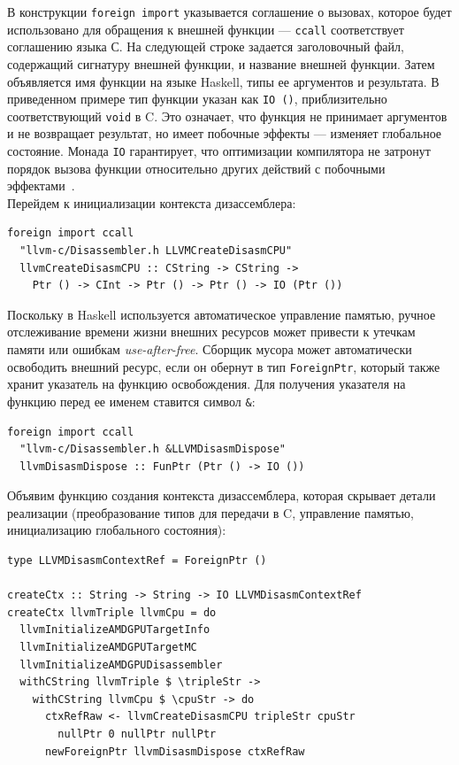 \documentclass[a4paper,14pt]{extarticle}
\begin{document}
{В конструкции \verb|foreign import| указывается соглашение о вызовах, которое будет
использовано для обращения к внешней функции — \verb|ccall| соответствует соглашению языка С.
На следующей строке задается заголовочный файл, содержащий сигнатуру внешней функции, и название внешней функции.
Затем объявляется имя функции на языке Haskell, типы ее аргументов и результата.
В приведенном примере тип функции указан как \verb|IO ()|, приблизительно соответствующий
\verb|void| в C. Это означает, что функция не принимает аргументов и не возвращает результат,
но имеет побочные эффекты — изменяет глобальное состояние.
Монада \verb|IO| гарантирует, что оптимизации компилятора не затронут порядок вызова функции
относительно других действий с побочными эффектами~\cite[глава~7]{rwhaskell}.\\

Перейдем к инициализации контекста дизассемблера:
\begin{verbatim}
foreign import ccall
  "llvm-c/Disassembler.h LLVMCreateDisasmCPU"
  llvmCreateDisasmCPU :: CString -> CString ->
    Ptr () -> CInt -> Ptr () -> Ptr () -> IO (Ptr ())
\end{verbatim}

Поскольку в Haskell используется автоматическое управление памятью,
ручное отслеживание времени жизни внешних ресурсов
может привести к утечкам памяти или ошибкам \textit{use-after-free}.
Сборщик мусора может автоматически освободить внешний ресурс, если он
обернут в тип \verb|ForeignPtr|, который также хранит указатель на функцию
освобождения. Для получения указателя на функцию перед ее именем ставится символ \verb|&|:
\begin{verbatim}
foreign import ccall
  "llvm-c/Disassembler.h &LLVMDisasmDispose"
  llvmDisasmDispose :: FunPtr (Ptr () -> IO ())
\end{verbatim}

Объявим функцию создания контекста дизассемблера, которая скрывает детали
реализации (преобразование типов для передачи в C, управление памятью, инициализацию
глобального состояния):
\begin{verbatim}
type LLVMDisasmContextRef = ForeignPtr ()

createCtx :: String -> String -> IO LLVMDisasmContextRef
createCtx llvmTriple llvmCpu = do
  llvmInitializeAMDGPUTargetInfo
  llvmInitializeAMDGPUTargetMC
  llvmInitializeAMDGPUDisassembler
  withCString llvmTriple $ \tripleStr ->
    withCString llvmCpu $ \cpuStr -> do
      ctxRefRaw <- llvmCreateDisasmCPU tripleStr cpuStr
        nullPtr 0 nullPtr nullPtr
      newForeignPtr llvmDisasmDispose ctxRefRaw
\end{verbatim}

}
\end{document}
